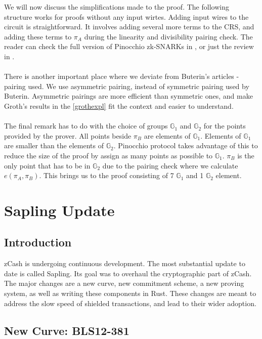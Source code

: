 We will now discuss the simplifications made to the proof. The following structure works for proofs without any input wirtes. Adding input wires to the circuit is straightforward. It involves adding several more terms to the CRS, and adding these terms to $\pi_A$ during the linearity and divisibility pairing check. The reader can check the full version of Pinocchio zk-SNARKs in \cite{parno2013pinocchio}, or just the review in \cite{ben2014succinct}.\\
\\
There is another important place where we deviate from Buterin's articles - pairing used. We use asymmetric pairing, instead of symmetric pairing used by Buterin. Asymmetric pairings are more efficient than symmetric ones, and make Groth's results in the \ref{grothexpl} fit the context and easier to understand.\\
\\
The final remark has to do with the choice of groups $\mathbb{G}_1$ and $\mathbb{G}_2$ for the points provided by the prover. All points beside $\pi_B$ are elements of $\mathbb{G}_1$. Elements of $\mathbb{G}_1$ are smaller than the elements of $\mathbb{G}_2$. Pinocchio protocol takes advantage of this to reduce the size of the proof by assign as many points as possible to $\mathbb{G}_1$. $\pi_B$ is the only point that has to be in $\mathbb{G}_2$ due to the pairing check where we calculate $e(\pi_A, \pi_B)$. This brings us to the proof consisting of 7 $\mathbb{G}_1$ and 1 $\mathbb{G}_2$ element.

\section{Sapling Update}

\subsection{Introduction}
zCash is undergoing continuous development. The most substantial update to date is called Sapling. Its goal was to overhaul the cryptographic part of zCash. The major changes are a new curve, new commitment scheme, a new proving system, as well as writing these components in Rust. These changes are meant to address the slow speed of shielded transactions, and lead to their wider adoption.

\subsection{New Curve: BLS12-381}

